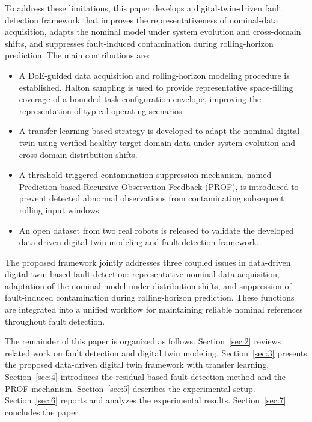 \documentclass[a4paper,10pt]{cas-sc}%
\newcommand{\roundtworev}[1]{\textcolor{roundtwored}{#1}}
\begin{document}
\roundtworev{To address these limitations, this paper develops a digital-twin-driven fault detection framework that improves the representativeness of nominal-data acquisition, adapts the nominal model under system evolution and cross-domain shifts, and suppresses fault-induced contamination during rolling-horizon prediction.} The main contributions are:
\begin{itemize}
	
	\item \roundtworev{A DoE-guided data acquisition and rolling-horizon modeling procedure is established. Halton sampling is used to provide representative space-filling coverage of a bounded task-configuration envelope, improving the representation of typical operating scenarios.}
	\item \roundtworev{A transfer-learning-based strategy is developed to adapt the nominal digital twin using verified healthy target-domain data under system evolution and cross-domain distribution shifts.}
	\item \roundtworev{A threshold-triggered contamination-suppression mechanism, named Prediction-based Recursive Observation Feedback (PROF), is introduced to prevent detected abnormal observations from contaminating subsequent rolling input windows.} 
	\item An open dataset from two real robots is released to validate the developed data-driven digital twin modeling and fault detection framework.
\end{itemize}

\roundtworev{The proposed framework jointly addresses three coupled issues in data-driven digital-twin-based fault detection: representative nominal-data acquisition, adaptation of the nominal model under distribution shifts, and suppression of fault-induced contamination during rolling-horizon prediction. These functions are integrated into a unified workflow for maintaining reliable nominal references throughout fault detection.}

The remainder of this paper is organized as follows.
Section~\ref{sec:2} reviews related work on fault detection and digital twin modeling.
Section~\ref{sec:3} presents the proposed data-driven digital twin framework with transfer learning.
Section~\ref{sec:4} introduces the residual-based fault detection method and the PROF mechanism.
Section~\ref{sec:5} describes the experimental setup.
Section~\ref{sec:6} reports and analyzes the experimental results.
Section~\ref{sec:7} concludes the paper.
\end{document}
